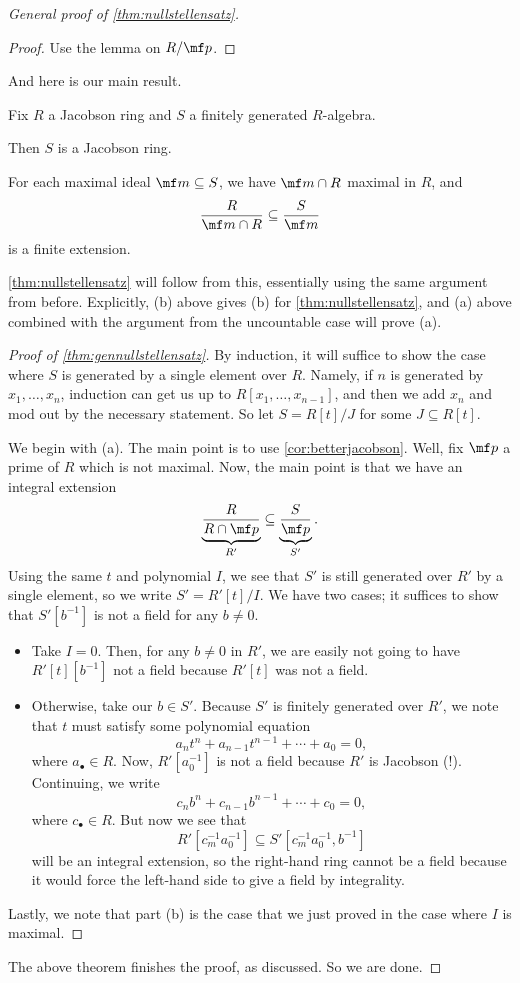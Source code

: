 \begin{proof}[General proof of \autoref{thm:nullstellensatz}]
\begin{corollary}
	\end{corollary}
	\begin{proof}
		Use the lemma on $R/\mf p$.
	\end{proof}
	And here is our main result.
	\begin{theorem} \label{thm:gennullstellensatz}
		Fix $R$ a Jacobson ring and $S$ a finitely generated $R$-algebra.
		\begin{listalph}
			\item Then $S$ is a Jacobson ring.
			\item For each maximal ideal $\mf m\subseteq S$, we have $\mf m\cap R$ maximal in $R$, and
			\[\frac R{\mf m\cap R}\subseteq\frac S{\mf m}\]
			is a finite extension.
		\end{listalph}
	\end{theorem}
	\autoref{thm:nullstellensatz} will follow from this, essentially using the same argument from before. Explicitly, (b) above gives (b) for \autoref{thm:nullstellensatz}, and (a) above combined with the argument from the uncountable case will prove (a).
	\begin{proof}[Proof of \autoref{thm:gennullstellensatz}]
		By induction, it will suffice to show the case where $S$ is generated by a single element over $R$. Namely, if $n$ is generated by $x_1,\ldots,x_n$, induction can get us up to $R[x_1,\ldots,x_{n-1}]$, and then we add $x_n$ and mod out by the necessary statement. So let $S=R[t]/J$ for some $J\subseteq R[t]$.

		We begin with (a). The main point is to use \autoref{cor:betterjacobson}. Well, fix $\mf p$ a prime of $R$ which is not maximal. Now, the main point is that we have an integral extension
		\[\underbrace{\frac R{R\cap\mf p}}_{R'}\subseteq\underbrace{\frac S{\mf p}}_{S'}.\]
		Using the same $t$ and polynomial $I$, we see that $S'$ is still generated over $R'$ by a single element, so we write $S'=R'[t]/I$. We have two cases; it suffices to show that $S'\left[b^{-1}\right]$ is not a field for any $b\ne0$.
		\begin{itemize}
			\item Take $I=0$. Then, for any $b\ne0$ in $R'$, we are easily not going to have $R'[t]\left[b^{-1}\right]$ not a field because $R'[t]$ was not a field.
			\item Otherwise, take our $b\in S'$. Because $S'$ is finitely generated over $R'$, we note that $t$ must satisfy some polynomial equation
			\[a_nt^n+a_{n-1}t^{n-1}+\cdots+a_0=0,\]
			where $a_\bullet\in R$. Now, $R'\left[a_0^{-1}\right]$ is not a field because $R'$ is Jacobson (!). Continuing, we write
			\[c_nb^n+c_{n-1}b^{n-1}+\cdots+c_0=0,\]
			where $c_\bullet\in R$. But now we see that
			\[R'\left[c_m^{-1}a_0^{-1}\right]\subseteq S'\left[c_m^{-1}a_0^{-1},b^{-1}\right]\]
			will be an integral extension, so the right-hand ring cannot be a field because it would force the left-hand side to give a field by integrality.
		\end{itemize}
		Lastly, we note that part (b) is the case that we just proved in the case where $I$ is maximal.
	\end{proof}
	\noindent The above theorem finishes the proof, as discussed. So we are done.
\end{proof}
